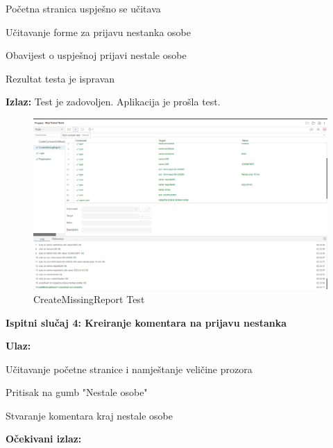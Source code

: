 			\begin{packed_enum}
				
				\item Početna stranica uspješno se učitava
				\item Učitavanje forme za prijavu nestanka osobe
				\item Obavijest o uspješnoj prijavi nestale osobe
				\item Rezultat testa je ispravan
				
			\end{packed_enum}
			
			\noindent \textbf{Izlaz:} Test je zadovoljen. Aplikacija je prošla test.
			
			\begin{figure}[H] \includegraphics[width=\linewidth]{./slike/Testovi/Selenium/Selenium_3.png}
				\caption{CreateMissingReport Test}
			\end{figure}
			
			\eject
			
			\noindent \textbf{Ispitni slučaj 4: Kreiranje komentara na prijavu nestanka}
			
			\noindent \textbf{Ulaz:}
			
			\begin{packed_enum}
				
				\item Učitavanje početne stranice i namještanje veličine prozora
				\item Pritisak na gumb "Nestale osobe"
				\item Stvaranje komentara kraj nestale osobe
				
			\end{packed_enum}
			
			\noindent \textbf{Očekivani izlaz:}
			
